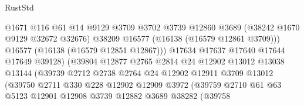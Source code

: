 \begin{lexlean}{RustStd}
\begin{coremodule}
                                      @1671
                                      @116
                                      @61
                                      @14
                                      @9129
                                      @3709
                                      @3702
                                      @3739
                                      @12860
                                      @3689
                                      (@38242 @1670 @9129 @32672 @32676)
                                      @38209
                                      @16577
                                      (@16138 (@16579 @12861 @3709)))
                                    @16577
                                    (@16138 (@16579 @12851 @12867)))
                                  @17634
                                  @17637
                                  @17640
                                  @17644
                                  @17649
                                  @39128)
                                (@39804
                                  @12877
                                  @2765
                                  @2814
                                  @24
                                  @12902
                                  @13012
                                  @13038
                                  @13144
                                  (@39739
                                    @2712
                                    @2738
                                    @2764
                                    @24
                                    @12902
                                    @12911
                                    @3709
                                    @13012
                                    (@39750
                                      @2711
                                      @330
                                      @228
                                      @12902
                                      @12909
                                      @3972
                                      (@39759
                                        @2710
                                        @61
                                        @63
                                        @5123
                                        @12901
                                        @12908
                                        @3739
                                        @12882
                                        @3689
                                        @38282
                                        (@39758

\end{coremodule}
\end{lexlean}
